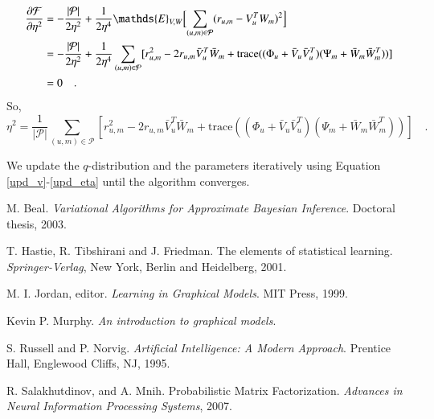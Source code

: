 \documentclass{article}
\begin{document}
\begin{align}
    \frac{\partial \mathcal{F}}{\partial \eta^2}
    &= -\frac{|\mathcal{P}|}{2\eta^2}
    + \frac{1}{2\eta^4}\mathds{E}_{V,W}\Bigl[\sum_{(u,m)\in\mathcal{P}}(r_{u,m}-V_u^TW_m)^2\Bigr] \notag \\
    &= -\frac{|\mathcal{P}|}{2\eta^2}
    + \frac{1}{2\eta^4}\sum_{(u,m)\in\mathcal{P}}[
    r^2_{u,m}-2r_{u,m}\bar{V}_u^T\bar{W}_m+\text{trace}( (\Phi_u+\bar{V}_u\bar{V}_u^T)(\Psi_m+\bar{W}_m\bar{W}_m^T) )
    ] \notag \\
    &= 0 \quad . \notag
\end{align}
So,
\begin{equation}\label{upd_eta}
    \eta^2 = \frac{1}{|\mathcal{P}|}\sum_{(u,m)\in\mathcal{P}}[
    r^2_{u,m}-2r_{u,m}\bar{V}_u^T\bar{W}_m+\text{trace}( (\Phi_u+\bar{V}_u\bar{V}_u^T)(\Psi_m+\bar{W}_m\bar{W}_m^T) )
    ] \quad .
\end{equation}

We update the $q$-distribution and the parameters iteratively using
Equation \eqref{upd_v}-\eqref{upd_eta} until the algorithm converges.




\begin{thebibliography}{10}

 M. Beal.
\textit{Variational Algorithms for Approximate Bayesian Inference}.
Doctoral thesis, 2003.

 T. Hastie, R. Tibshirani and J. Friedman.
 The elements of statistical learning.
 \textit{Springer-Verlag}, New York, Berlin and Heidelberg, 2001.

M. I. Jordan, editor.
\textit{Learning in Graphical Models}.
MIT Press, 1999.

Kevin P. Murphy.
\textit{An introduction to graphical models}.

S. Russell and P. Norvig.
\textit{Artificial Intelligence: A Modern Approach}.
Prentice Hall, Englewood Cliffs, NJ, 1995.

 R. Salakhutdinov, and A. Mnih.
Probabilistic Matrix Factorization.
\textit{Advances in Neural Information Processing Systems},
2007.

\end{thebibliography}

\end{document}
